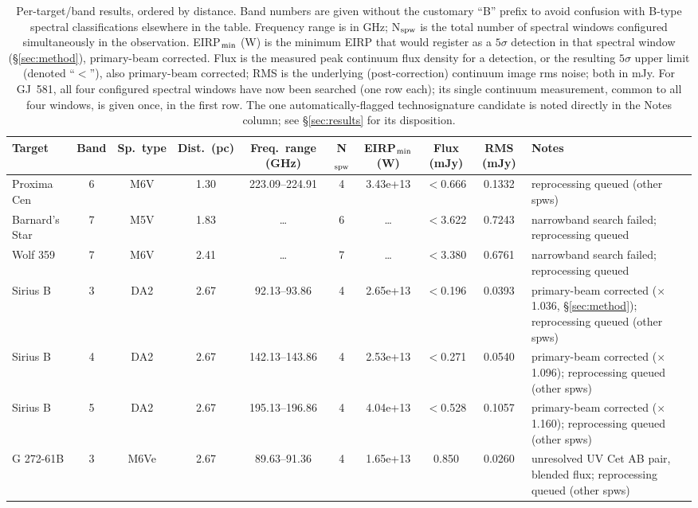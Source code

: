 \documentclass{openjournal}
\begin{document}
\begin{table}
\centering
\scriptsize
\caption{Per-target/band results, ordered by distance. Band numbers are
given without the customary ``B'' prefix to avoid confusion with B-type
spectral classifications elsewhere in the table. Frequency range is in
GHz; N$_{\rm spw}$ is the total number of spectral windows configured
simultaneously in the observation. EIRP$_{\rm min}$ (W) is the minimum
EIRP that would register as a $5\sigma$ detection in that spectral
window (\S\ref{sec:method}), primary-beam corrected. Flux is the measured
peak continuum flux density for a detection, or the resulting $5\sigma$
upper limit (denoted ``$<$''), also primary-beam corrected; RMS is the
underlying (post-correction) continuum image rms noise; both in mJy. For
GJ~581, all four configured spectral windows have now been searched
(one row each); its single continuum measurement, common to all four
windows, is given once, in the first row. The one automatically-flagged
technosignature candidate is noted directly in the Notes column; see
\S\ref{sec:results} for its disposition.}
\label{tab:full}
\begin{tabularx}{\textwidth}{@{}l c c c c c c c c X@{}}
\hline
Target & Band & Sp.\ type & Dist.\ (pc) & Freq.\ range (GHz) & N$_{\rm spw}$ & EIRP$_{\rm min}$ (W) & Flux (mJy) & RMS (mJy) & Notes \\
\hline
Proxima Cen & 6 & M6V & 1.30 & 223.09--224.91 & 4 & 3.43e+13 & $<$0.666 & 0.1332 & reprocessing queued (other spws) \\
Barnard's Star & 7 & M5V & 1.83 & \ldots & 6 & \ldots & $<$3.622 & 0.7243 & narrowband search failed; reprocessing queued \\
Wolf  359 & 7 & M6V & 2.41 & \ldots & 7 & \ldots & $<$3.380 & 0.6761 & narrowband search failed; reprocessing queued \\
Sirius B & 3 & DA2 & 2.67 & 92.13--93.86 & 4 & 2.65e+13 & $<$0.196 & 0.0393 & primary-beam corrected ($\times$1.036, \S\ref{sec:method}); reprocessing queued (other spws) \\
Sirius B & 4 & DA2 & 2.67 & 142.13--143.86 & 4 & 2.53e+13 & $<$0.271 & 0.0540 & primary-beam corrected ($\times$1.096); reprocessing queued (other spws) \\
Sirius B & 5 & DA2 & 2.67 & 195.13--196.86 & 4 & 4.04e+13 & $<$0.528 & 0.1057 & primary-beam corrected ($\times$1.160); reprocessing queued (other spws) \\
G 272-61B & 3 & M6Ve & 2.67 & 89.63--91.36 & 4 & 1.65e+13 & 0.850 & 0.0260 & unresolved UV Cet AB pair, blended flux; reprocessing queued (other spws) \\

\end{tabularx}
\end{table}
\end{document}
